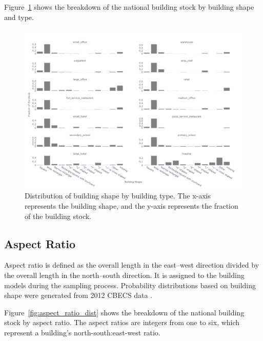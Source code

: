 Figure~\ref{fig:shape_dist} shows the breakdown of the national building stock by building shape and type. 

\begin{figure}[H]
    \centering \includegraphics[width=1.0\textwidth]{figures/shape.png}
    \caption[Distribution of building shape by building type.]{Distribution of building shape by building type. The x-axis represents the building shape, and the y-axis represents the fraction of the building stock.}
    \label{fig:shape_dist}
\end{figure}

\pagebreak

\subsection{Aspect Ratio} \label{subsec_aspect_ratio}
Aspect ratio is defined as the overall length in the east–west direction divided by the overall length in the north–south direction. It is assigned to the building models during the sampling process. Probability distributions based on building shape were generated from 2012 CBECS data \citep{eia2012cbecs}.

Figure~\ref{fig:aspect_ratio_dist} shows the breakdown of the national building stock by aspect ratio. The aspect ratios are integers from one to six, which represent a building's north-south:east-west ratio.

